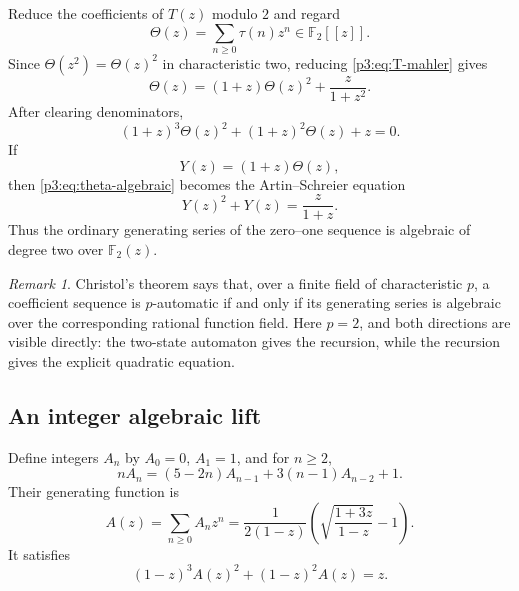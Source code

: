 \documentclass[11pt,oneside]{article}
\theoremstyle{definition}
\theoremstyle{remark}
\newtheorem{remark}[theorem]{Remark}
\newcommand{\Ftwo}{\mathbb F_2}
\begin{document}
Reduce the coefficients of $T(z)$ modulo $2$ and regard
\[
 \Theta(z)=\sum_{n\ge0}\tau(n)z^n\in\Ftwo[[z]].
\]
Since $\Theta(z^2)=\Theta(z)^2$ in characteristic two, reducing
\cref{p3:eq:T-mahler} gives
\begin{equation}\label{p3:eq:theta-mod2-mahler}
 \Theta(z)=(1+z)\Theta(z)^2+\frac{z}{1+z^2}.
\end{equation}
After clearing denominators,
\begin{equation}\label{p3:eq:theta-algebraic}
 \boxed{\quad
 (1+z)^3\Theta(z)^2+(1+z)^2\Theta(z)+z=0.
 \quad}
\end{equation}
If
\begin{equation}\label{p3:eq:Y-definition}
 Y(z)=(1+z)\Theta(z),
\end{equation}
then \cref{p3:eq:theta-algebraic} becomes the Artin--Schreier equation
\begin{equation}\label{p3:eq:Artin-Schreier}
 \boxed{\qquad Y(z)^2+Y(z)=\frac{z}{1+z}.\qquad}
\end{equation}
Thus the ordinary generating series of the zero--one sequence is algebraic of
degree two over $\Ftwo(z)$.

\begin{remark}
Christol's theorem says that, over a finite field of characteristic $p$, a
coefficient sequence is $p$-automatic if and only if its generating series is
algebraic over the corresponding rational function field.  Here $p=2$, and
both directions are visible directly: the two-state automaton gives the
recursion, while the recursion gives the explicit quadratic equation.
\end{remark}

\subsection{An integer algebraic lift}

Define integers $A_n$ by $A_0=0$, $A_1=1$, and for $n\ge2$,
\begin{equation}\label{p3:eq:integer-lift-recurrence}
 nA_n=(5-2n)A_{n-1}+3(n-1)A_{n-2}+1.
\end{equation}
Their generating function is
\begin{equation}\label{p3:eq:integer-lift-generating}
 A(z)=\sum_{n\ge0}A_nz^n
 =\frac1{2(1-z)}
  \left(\sqrt{\frac{1+3z}{1-z}}-1\right).
\end{equation}
It satisfies
\begin{equation}\label{p3:eq:integer-lift-algebraic}
 \boxed{\qquad
 (1-z)^3A(z)^2+(1-z)^2A(z)=z.
 \qquad}
\end{equation}
\end{document}
